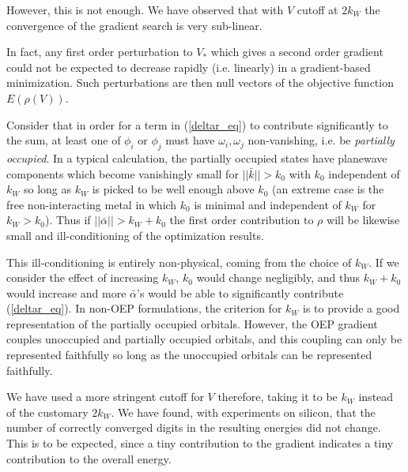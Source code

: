 \documentclass{article}
\newcommand{\Vscp}{V}
\begin{document}
However, this is not enough.  We have observed that with $\Vscp$ cutoff
at $2 k_W$ the convergence of the gradient search is very sub-linear.

In fact, any first order perturbation to $\Vscp_*$ which gives a
second order gradient could not be expected to decrease rapidly
(i.e. linearly) in a gradient-based minimization.  Such perturbations
are then null vectors of the objective function $E(\rho(\Vscp))$.

Consider that in order for a term in (\ref{deltar_eq}) to contribute
significantly to the sum, at least one of $\phi_i$ or $\phi_j$ must
have $\omega_i,\omega_j$ non-vanishing, i.e. be {\em partially
occupied}.  In a typical calculation, the partially occupied states
have planewave components which become vanishingly small for
$||\bar{k}|| > k_0$ with $k_0$ independent of $k_{W}$ so long as
$k_{W}$ is picked to be well enough above $k_0$ (an extreme case is
the free non-interacting metal in which $k_{0}$ is minimal and
independent of $k_W$ for $k_W > k_0$).  Thus if $||\bar{\alpha}|| >
k_{W}+k_{0}$ the first order contribution to $\rho$ will be likewise
small and ill-conditioning of the optimization results.

This ill-conditioning is entirely non-physical, coming from the choice
of $k_W$.  If we consider the effect of increasing $k_{W}$, $k_{0}$
would change negligibly, and thus $k_W + k_0$ would increase and more
$\bar{\alpha}$'s would be able to significantly contribute
(\ref{deltar_eq}).  In non-OEP formulations, the criterion for $k_W$
is to provide a good representation of the partially occupied
orbitals.  However, the OEP gradient couples unoccupied and partially
occupied orbitals, and this coupling can only be represented
faithfully so long as the unoccupied orbitals can be represented
faithfully.

We have used a more stringent cutoff for $\Vscp$ therefore, taking it
to be $k_W$ instead of the customary $2 k_W$.  We have found, with
experiments on silicon, that the number of correctly converged digits
in the resulting energies did not change.  This is to be expected,
since a tiny contribution to the gradient indicates a tiny
contribution to the overall energy.
\end{document}
